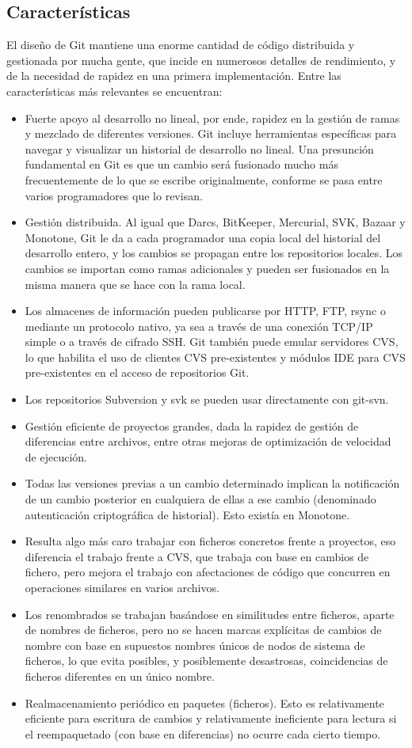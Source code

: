 \subsection{Características}
El diseño de Git mantiene una enorme cantidad de código distribuida y gestionada por mucha gente, que incide en numerosos detalles de rendimiento, y de la necesidad de rapidez en una primera implementación.
Entre las características más relevantes se encuentran:
\begin{itemize}
	\item Fuerte apoyo al desarrollo no lineal, por ende, rapidez en la gestión de ramas y mezclado de diferentes versiones. Git incluye herramientas específicas para navegar y visualizar un historial de desarrollo no lineal. Una presunción fundamental en Git es que un cambio será fusionado mucho más frecuentemente de lo que se escribe originalmente, conforme se pasa entre varios programadores que lo revisan.
	\item Gestión distribuida. Al igual que Darcs, BitKeeper, Mercurial, SVK, Bazaar y Monotone, Git le da a cada programador una copia local del historial del desarrollo entero, y los cambios se propagan entre los repositorios locales. Los cambios se importan como ramas adicionales y pueden ser fusionados en la misma manera que se hace con la rama local.
	\item Los almacenes de información pueden publicarse por HTTP, FTP, rsync o mediante un protocolo nativo, ya sea a través de una conexión TCP/IP simple o a través de cifrado SSH. Git también puede emular servidores CVS, lo que habilita el uso de clientes CVS pre-existentes y módulos IDE para CVS pre-existentes en el acceso de repositorios Git.
	\item Los repositorios Subversion y svk se pueden usar directamente con git-svn.
	\item Gestión eficiente de proyectos grandes, dada la rapidez de gestión de diferencias entre archivos, entre otras mejoras de optimización de velocidad de ejecución.
	\item Todas las versiones previas a un cambio determinado implican la notificación de un cambio posterior en cualquiera de ellas a ese cambio (denominado autenticación criptográfica de historial). Esto existía en Monotone.
	\item Resulta algo más caro trabajar con ficheros concretos frente a proyectos, eso diferencia el trabajo frente a CVS, que trabaja con base en cambios de fichero, pero mejora el trabajo con afectaciones de código que concurren en operaciones similares en varios archivos.
	\item Los renombrados se trabajan basándose en similitudes entre ficheros, aparte de nombres de ficheros, pero no se hacen marcas explícitas de cambios de nombre con base en supuestos nombres únicos de nodos de sistema de ficheros, lo que evita posibles, y posiblemente desastrosas, coincidencias de ficheros diferentes en un único nombre.
	\item Realmacenamiento periódico en paquetes (ficheros). Esto es relativamente eficiente para escritura de cambios y relativamente ineficiente para lectura si el reempaquetado (con base en diferencias) no ocurre cada cierto tiempo.	
\end{itemize}
